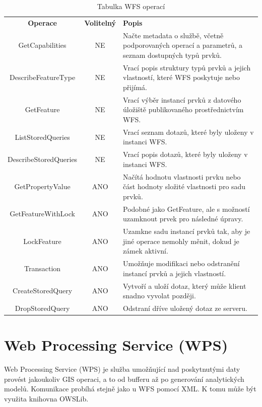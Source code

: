 \documentclass[a4paper,oneside,12pt]{book}
\begin{document}
\begin{table}[htbp]
  \centering
  \caption{Tabulka WFS operací} 
  \label{tab:WFS}
  \begin{tabular}{|c|c|p{7cm}|}
    \hline
    \textbf{Operace} & \textbf{Volitelný} & \textbf{Popis} \\
    \hhline{=|=|=}
    GetCapabilities & NE & Načte metadata o službě, včetně podporovaných operací a parametrů, a seznam dostupných typů prvků. \\
    \hline
    DescribeFeatureType & NE & Vrací popis struktury typů prvků a jejich vlastností, které WFS poskytuje nebo přijímá. \\
    \hline
    GetFeature & NE & Vrací výběr instancí prvků z datového úložiště publikovaného prostřednictvím WFS. \\
    \hline
    ListStoredQueries & NE & Vrací seznam dotazů, které byly uloženy v instanci WFS. \\
    \hline
    DescribeStoredQueries & NE & Vrací popis dotazů, které byly uloženy v instanci WFS. \\
    \hline
    GetPropertyValue & ANO & Načítá hodnotu vlastnosti prvku nebo část hodnoty složité vlastnosti pro sadu prvků. \\
    \hline
    GetFeatureWithLock & ANO & Podobné jako GetFeature, ale s možností uzamknout prvek pro následné úpravy. \\
    \hline
    LockFeature & ANO & Uzamkne sadu instancí prvků tak, aby je jiné operace nemohly měnit, dokud je zámek aktivní. \\
    \hline
    Transaction & ANO & Umožňuje modifikaci nebo odstranění instancí prvků a jejich vlastností. \\
    \hline
    CreateStoredQuery & ANO & Vytvoří a uloží dotaz, který může klient snadno vyvolat později. \\
    \hline
    DropStoredQuery & ANO & Odstraní dříve uložený dotaz ze serveru. \\
    \hline
  \end{tabular}
\end{table}

\section{Web Processing Service (WPS)} \label{wps}
\hspace{10mm}Web Processing Service (WPS) je služba umožňující nad poskytnutými daty provést jakoukoliv GIS operaci, a to od bufferu až po generování analytických modelů. Komunikace probíhá stejně jako u WFS pomocí XML. K tomu může být využita knihovna OWSLib.
\end{document}
